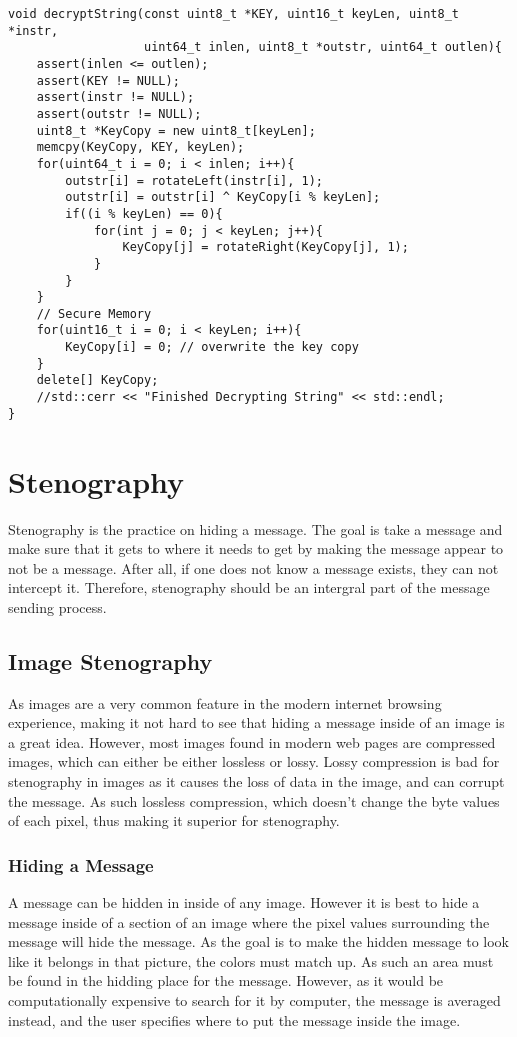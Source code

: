 \documentclass[12pt]{article}
\begin{document}
    \singlespacing
    \begin{lstlisting}[caption=C++ Decryption Code]
void decryptString(const uint8_t *KEY, uint16_t keyLen, uint8_t *instr,
                   uint64_t inlen, uint8_t *outstr, uint64_t outlen){
    assert(inlen <= outlen);
    assert(KEY != NULL);
    assert(instr != NULL);
    assert(outstr != NULL);
    uint8_t *KeyCopy = new uint8_t[keyLen];
    memcpy(KeyCopy, KEY, keyLen);
    for(uint64_t i = 0; i < inlen; i++){
        outstr[i] = rotateLeft(instr[i], 1);
        outstr[i] = outstr[i] ^ KeyCopy[i % keyLen];
        if((i % keyLen) == 0){
            for(int j = 0; j < keyLen; j++){
                KeyCopy[j] = rotateRight(KeyCopy[j], 1);
            }
        }
    }
    // Secure Memory
    for(uint16_t i = 0; i < keyLen; i++){
        KeyCopy[i] = 0; // overwrite the key copy
    }
    delete[] KeyCopy;
    //std::cerr << "Finished Decrypting String" << std::endl;
}
    \end{lstlisting}
    \doublespacing
 
\section{Stenography}
  Stenography is the practice on hiding a message. The goal is take
  a message and make sure that it gets to where it needs to get by
  making the message appear to not be a message. After all, if one
  does not know a message exists, they can not intercept it. Therefore,
  stenography should be an intergral part of the message sending process.
  
  \subsection{Image Stenography}
    As images are a very common feature in the modern internet browsing
    experience, making it not hard to see that hiding a message inside 
    of an image is a great idea. However, most images found in 
    modern web pages are compressed images, which can either be either
    lossless or lossy. Lossy compression is bad for stenography in 
    images as it causes the loss of data in the image, and can
    corrupt the message. As such lossless compression, which doesn't 
    change the byte values of each pixel, thus making it superior 
    for stenography.
    
    \subsubsection{Hiding a Message}
      A message can be hidden in inside of any image. However it is best 
      to hide a message inside of a section of an image where the pixel
      values surrounding the message will hide the message. As the goal
      is to make the hidden message to look like it belongs in that
      picture, the colors must match up. As such an area must be found
      in the hidding place for the message. However, as it would be
      computationally expensive to search for it by computer, the
      message is averaged instead, and the user specifies where to put
      the message inside the image.
\end{document}
